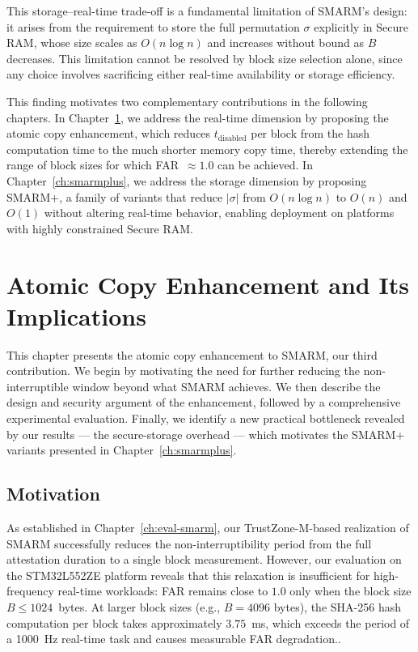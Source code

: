 \documentclass[a4paper,10pt]{article}
\begin{document}
{This storage--real-time trade-off is a fundamental limitation of SMARM's 
design: it arises from the requirement to store the full permutation 
$\sigma$ explicitly in Secure RAM, whose size scales as $O(n \log n)$ and 
increases without bound as $B$ decreases. This limitation cannot be resolved by 
block size selection alone, since any choice involves sacrificing either 
real-time availability or storage efficiency.

This finding motivates two complementary contributions in the following 
chapters. In Chapter~\ref{ch:atomic-copy}, we address the real-time dimension by proposing 
the atomic copy enhancement, which reduces $t_{\mathrm{disabled}}$ per 
block from the hash computation time to the much shorter memory copy time, 
thereby extending the range of block sizes for which FAR~$\approx 1.0$ 
can be achieved. In Chapter~\ref{ch:smarmplus}, we address the storage dimension by 
proposing SMARM+, a family of variants that reduce $|\sigma|$ from 
$O(n \log n)$ to $O(n)$ and $O(1)$ without altering real-time behavior, 
enabling deployment on platforms with highly constrained Secure RAM.


\section{Atomic Copy Enhancement and Its Implications}
\label{ch:atomic-copy}

This chapter presents the atomic copy enhancement to SMARM, our third 
contribution. We begin by motivating the need for further reducing the 
non-interruptible window beyond what SMARM achieves. We then describe the 
design and security argument of the enhancement, followed by a comprehensive 
experimental evaluation. Finally, we identify a new practical bottleneck 
revealed by our results — the secure-storage overhead — which motivates the 
SMARM+ variants presented in Chapter~\ref{ch:smarmplus}.


\subsection{Motivation}

As established in Chapter~\ref{ch:eval-smarm}, our TrustZone-M-based 
realization of SMARM successfully reduces the non-interruptibility 
period from the full attestation duration to a single block 
measurement. However, our evaluation on the STM32L552ZE platform 
reveals that this relaxation is insufficient for high-frequency 
real-time workloads: FAR remains close to $1.0$ only when the block 
size $B \leq 1024$~bytes. At larger block sizes (e.g., $B = 4096$ 
bytes), the SHA-256 hash computation per block takes approximately 
$3.75$~ms, which exceeds the period of a 1000~Hz real-time task and 
causes measurable FAR degradation..

}
\end{document}
